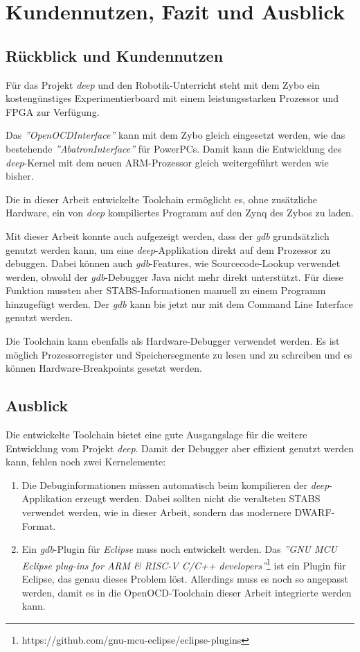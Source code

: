 \chapter{Kundennutzen, Fazit und Ausblick}
\section{Rückblick und Kundennutzen}
Für das Projekt \textit{deep} und den Robotik-Unterricht steht mit dem Zybo ein kostengünstiges Experimentierboard mit einem leistungsstarken Prozessor und FPGA zur Verfügung.

Das \textit{''OpenOCDInterface''} kann mit dem Zybo gleich eingesetzt werden, wie das bestehende \textit{''AbatronInterface''} für PowerPCs.
Damit kann die Entwicklung des \textit{deep}-Kernel mit dem neuen ARM-Prozessor gleich weitergeführt werden wie bisher.

Die in dieser Arbeit entwickelte Toolchain ermöglicht es, ohne zusätzliche Hardware, ein von \textit{deep} kompiliertes Programm auf den Zynq des Zybos zu laden.

Mit dieser Arbeit konnte auch aufgezeigt werden, dass der \textit{gdb} grundsätzlich genutzt werden kann, um eine \textit{deep}-Applikation direkt auf dem Prozessor zu debuggen.
Dabei können auch \textit{gdb}-Features, wie Sourcecode-Lookup verwendet werden, obwohl der \textit{gdb}-Debugger Java nicht mehr direkt unterstützt.
Für diese Funktion mussten aber STABS-Informationen manuell zu einem Programm hinzugefügt werden.
Der \textit{gdb} kann bis jetzt nur mit dem Command Line Interface genutzt werden.

Die Toolchain kann ebenfalls als Hardware-Debugger verwendet werden.
Es ist möglich Prozessorregister und Speichersegmente zu lesen und zu schreiben und es können Hardware-Breakpoints gesetzt werden.



\section{Ausblick}
Die entwickelte Toolchain bietet eine gute Ausgangslage für die weitere Entwicklung vom Projekt \textit{deep}.
Damit der Debugger aber effizient genutzt werden kann, fehlen noch zwei Kernelemente:
\begin{enumerate}
	\item Die Debuginformationen müssen automatisch beim kompilieren der \textit{deep}-Applikation erzeugt werden.
		  Dabei sollten nicht die veralteten STABS verwendet werden, wie in dieser Arbeit, sondern das modernere DWARF-Format.
	\item Ein \textit{gdb}-Plugin für \textit{Eclipse} muss noch entwickelt werden.
		  Das \textit{''GNU MCU Eclipse plug-ins for ARM \& RISC-V C/C++ developers''}\footnote{https://github.com/gnu-mcu-eclipse/eclipse-plugins} ist ein Plugin für Eclipse, das genau dieses Problem löst.
		  Allerdings muss es noch so angepasst werden, damit es in die OpenOCD-Toolchain dieser Arbeit integrierte werden kann.
\end{enumerate}




